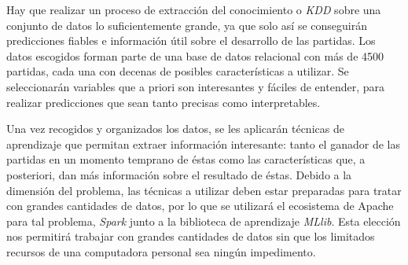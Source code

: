 Hay que realizar un proceso de extracción del
conocimiento o \emph{KDD} sobre una conjunto de datos lo suficientemente
grande, ya que solo así se conseguirán predicciones fiables e información útil
sobre el desarrollo de las partidas. 
Los datos escogidos forman parte de una
base de datos relacional con más de 4500 partidas, cada una con decenas de posibles
características a utilizar. Se seleccionarán variables que a priori son
interesantes y fáciles de entender, para realizar predicciones que sean tanto
precisas como interpretables.

Una vez recogidos y organizados los datos, se les aplicarán técnicas de
aprendizaje que permitan extraer información interesante: tanto el ganador
de las partidas en un momento temprano de éstas como las características que,
a posteriori, dan más información sobre el resultado de éstas. Debido a la
dimensión del problema, las técnicas a utilizar deben estar preparadas para
tratar con grandes cantidades de datos, por lo que se utilizará el ecosistema
de Apache para tal problema, \emph{Spark} junto a la biblioteca de aprendizaje
\emph{MLlib}. Esta elección nos permitirá trabajar con grandes cantidades de
datos sin que los limitados recursos de una computadora personal sea ningún
impedimento.


